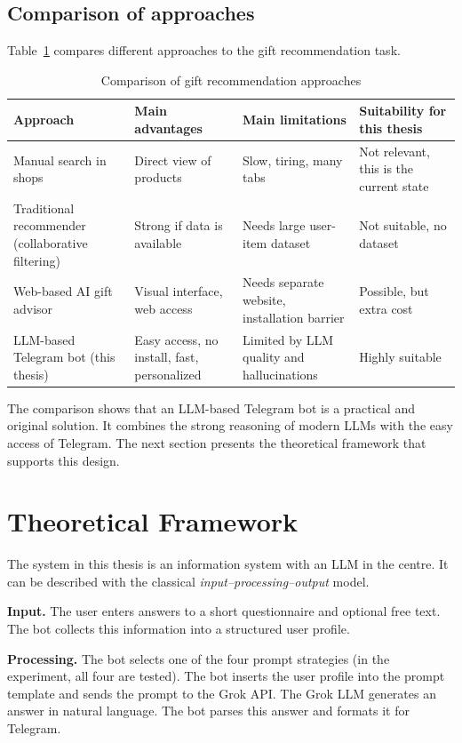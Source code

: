 \subsection{Comparison of approaches}

Table~\ref{tab:related-work} compares different approaches to the gift recommendation task.

\begin{table}[H]
\centering
\caption{Comparison of gift recommendation approaches}
\label{tab:related-work}
\begin{tabular}{p{3cm} p{3cm} p{3cm} p{3cm}}
\toprule
\textbf{Approach} & \textbf{Main advantages} & \textbf{Main limitations} & \textbf{Suitability for this thesis} \\
\midrule
Manual search in shops & Direct view of products & Slow, tiring, many tabs & Not relevant, this is the current state \\
Traditional recommender (collaborative filtering) & Strong if data is available & Needs large user-item dataset & Not suitable, no dataset \\
Web-based AI gift advisor & Visual interface, web access & Needs separate website, installation barrier & Possible, but extra cost \\
LLM-based Telegram bot (this thesis) & Easy access, no install, fast, personalized & Limited by LLM quality and hallucinations & Highly suitable \\
\bottomrule
\end{tabular}
\end{table}

The comparison shows that an LLM-based Telegram bot is a practical and original solution. It combines the strong reasoning of modern LLMs with the easy access of Telegram. The next section presents the theoretical framework that supports this design.

\section{Theoretical Framework}
\label{sec:framework}

The system in this thesis is an information system with an LLM in the centre. It can be described with the classical \textit{input--processing--output} model.

\textbf{Input.} The user enters answers to a short questionnaire and optional free text. The bot collects this information into a structured user profile.

\textbf{Processing.} The bot selects one of the four prompt strategies (in the experiment, all four are tested). The bot inserts the user profile into the prompt template and sends the prompt to the Grok API. The Grok LLM generates an answer in natural language. The bot parses this answer and formats it for Telegram.

